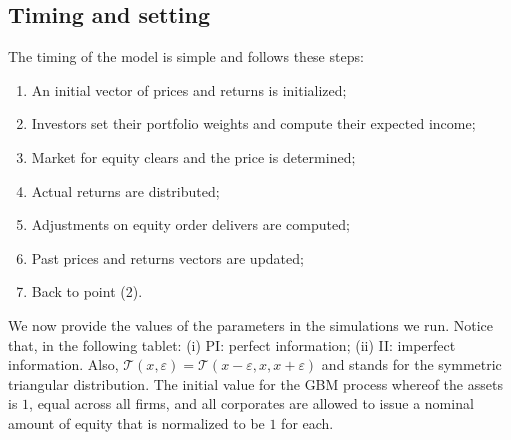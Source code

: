 \documentclass[11pt]{article}
\begin{document}
\subsection{Timing and setting}
The timing of the model is simple and follows these steps:
\begin{enumerate}
	\item An initial vector of prices and returns is initialized;
	\item Investors set their portfolio weights and compute their expected income;
	\item Market for equity clears and the price is determined;
	\item Actual returns are distributed;
	\item Adjustments on equity order delivers are computed;
	\item Past prices and returns vectors are updated;
	\item Back to point (2).
\end{enumerate}
We now provide the values of the parameters in the simulations we run. Notice that, in the following tablet: (i) PI: perfect information; (ii) II: imperfect information. Also, $\mathcal{T}(x,\varepsilon) = \mathcal{T}(x-\varepsilon,x,x+\varepsilon)$ and stands for the symmetric triangular distribution. The initial value for the GBM process whereof the assets is $1$, equal across all firms, and all corporates are allowed to issue a nominal amount of equity that is normalized to be $1$ for each.
\end{document}
